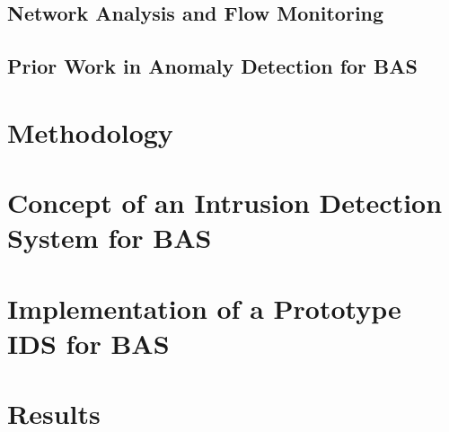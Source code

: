 \documentclass[12pt, a4paper, titlepage, oneside, final]{book}
\begin{document}
	\section{Network Analysis and Flow Monitoring}
	\label{sec:background:network}
	
	
	\clearpage
	\section{Prior Work in Anomaly Detection for BAS}
	\label{sec:background:prior-work}
	
	
	\chapter{Methodology}
	\label{sec:methods}
	
	
	\chapter{Concept of an Intrusion Detection System for BAS}
	\label{sec:concept}
	
	
	\chapter[Implementation of a Prototype]{Implementation of a Prototype IDS for BAS}
	\label{sec:impl}
	
	
	\chapter{Results}
	\label{sec:results}
	
	
\end{document}
